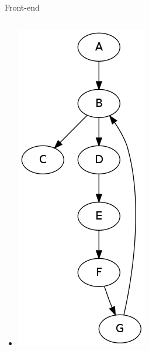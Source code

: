 \documentclass{beamer}
\begin{document}
\begin{frame}{Front-end}
\begin{columns}
\begin{column}{0.4\textwidth}
\begin{center}
\begin{itemize}
          \item<2->[] \includegraphics[scale=0.2]{controlflow.png}
        \end{itemize}
      \end{center}      
    \end{column}
  \end{columns}
\end{frame}
\end{document}
